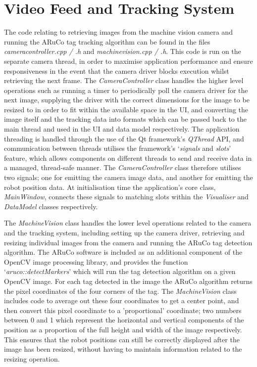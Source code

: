 \section{Video Feed and Tracking System} \label{VideoFeedAndTrackingSystem}
The code relating to retrieving images from the machine vision camera and running the ARuCo tag tracking algorithm can be found in the files \textit{cameracontroller.cpp / .h} and \textit{machinevision.cpp / .h}. This code is run on the separate camera thread, in order to maximise application performance and ensure responsiveness in the event that the camera driver blocks execution whilst retrieving the next frame. The \textit{CameraController} class handles the higher level operations such as running a timer to periodically poll the camera driver for the next image, supplying the driver with the correct dimensions for the image to be resized to in order to fit within the available space in the UI, and converting the image itself and the tracking data into formats which can be passed back to the main thread and used in the UI and data model respectively. The application threading is handled through the use of the Qt framework's \textit{QThread} API, and communication between threads utilises the framework's `\textit{signals} and \textit{slots}' feature, which allows components on different threads to send and receive data in a managed, thread-safe manner. The \textit{CameraController} class therefore utilises two signals; one for emitting the camera image data, and another for emitting the robot position data. At initialisation time the application's core class, \textit{MainWindow}, connects these signals to matching slots within the \textit{Visualiser} and \textit{DataModel} classes respectively.

The \textit{MachineVision} class handles the lower level operations related to the camera and the tracking system, including setting up the camera driver, retrieving and resizing individual images from the camera and running the ARuCo tag detection algorithm. The ARuCo software is included as an additional component of the OpenCV image processing library, and provides the function `\textit{aruco::detectMarkers}' which will run the tag detection algorithm on a given OpenCV image. For each tag detected in the image the ARuCo algorithm returns the pixel coordinates of the four corners of the tag. The \textit{MachineVision} class includes code to average out these four coordinates to get a center point, and then convert this pixel coordinate to a 'proportional' coordinate; two numbers between 0 and 1 which represent the horizontal and vertical components of the position as a proportion of the full height and width of the image respectively. This ensures that the robot positions can still be correctly displayed after the image has been resized, without having to maintain information related to the resizing operation.

